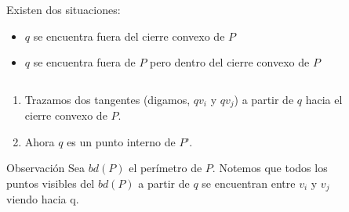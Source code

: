 \documentclass[aspectratio=169,xcolor=dvipsnames, t]{beamer}
\begin{document}

\begin{frame}[c]
  Existen dos situaciones:
  \begin{itemize}
  \item $q$ se encuentra fuera del cierre convexo de  $P$
  \item $q$ se encuentra fuera de $P$ pero dentro del cierre convexo de $P$
  \end{itemize}
\end{frame}

\begin{frame}{}
  \begin{columns}
    \begin{column}{0.45\textwidth}
      \begin{enumerate}
      \item Trazamos dos tangentes (digamos, $qv_{i}$ y $qv_{j}$) a partir de $q$ hacia el cierre convexo de $P$. 
      \item Ahora $q$ es un punto interno de $P’$.\\
      \end{enumerate}
      \begin{block}{Observación}
        \small
        Sea $bd(P)$ el perímetro de $P$. Notemos que todos los puntos visibles del $bd(P)$ a partir de $q$ se encuentran entre $v_{i}$ y $v_{j}$ viendo hacia q.
      \end{block}
    \end{column}
    \begin{column}{0.45\textwidth}  %
      \vspace{-1cm}
      \begin{figure}
        \centering

\end{figure}
\end{column}
\end{columns}
\end{frame}
\end{document}
